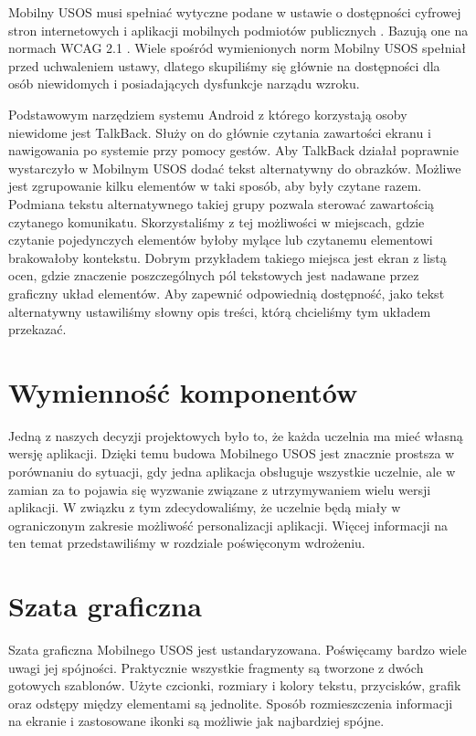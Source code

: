 \documentclass{pracamgr}
\begin{document}
Mobilny USOS musi spełniać wytyczne podane w ustawie o dostępności cyfrowej stron
internetowych i aplikacji mobilnych podmiotów publicznych \cite{uodc}. Bazują one
na normach WCAG 2.1 \cite{wcag21}. Wiele spośród wymienionych norm Mobilny USOS
spełniał przed uchwaleniem ustawy, dlatego skupiliśmy się głównie na dostępności
dla osób niewidomych i posiadających dysfunkcje narządu wzroku.

Podstawowym narzędziem systemu Android z którego korzystają osoby niewidome jest
TalkBack. Służy on do głównie czytania zawartości ekranu i nawigowania po systemie
przy pomocy gestów. Aby TalkBack działał poprawnie wystarczyło w Mobilnym USOS
dodać tekst alternatywny do obrazków. Możliwe jest zgrupowanie kilku elementów w
taki sposób, aby były czytane razem. Podmiana tekstu alternatywnego takiej grupy
pozwala sterować zawartością czytanego komunikatu. Skorzystaliśmy z tej możliwości
w miejscach, gdzie czytanie pojedynczych elementów byłoby mylące lub czytanemu
elementowi brakowałoby kontekstu. Dobrym przykładem takiego miejsca jest ekran z
listą ocen, gdzie znaczenie poszczególnych pól tekstowych jest nadawane przez
graficzny układ elementów. Aby zapewnić odpowiednią dostępność, jako tekst alternatywny
ustawiliśmy słowny opis treści, którą chcieliśmy tym układem przekazać.

\section{Wymienność komponentów}

Jedną z naszych decyzji projektowych było to, że każda uczelnia ma mieć własną
wersję aplikacji. Dzięki temu budowa Mobilnego USOS jest znacznie prostsza w porównaniu
do sytuacji, gdy jedna aplikacja obsługuje wszystkie uczelnie, ale w zamian za to
pojawia się wyzwanie związane z utrzymywaniem wielu wersji aplikacji. W związku z
tym zdecydowaliśmy, że uczelnie będą miały w ograniczonym zakresie możliwość
personalizacji aplikacji. Więcej informacji na ten temat przedstawiliśmy w rozdziale
poświęconym wdrożeniu.

\section{Szata graficzna}

Szata graficzna Mobilnego USOS jest ustandaryzowana. Poświęcamy bardzo wiele
uwagi jej spójności. Praktycznie wszystkie fragmenty są tworzone z dwóch gotowych
szablonów. Użyte czcionki, rozmiary i kolory tekstu, przycisków, grafik oraz odstępy
między elementami są jednolite. Sposób rozmieszczenia informacji na ekranie i
zastosowane ikonki są możliwie jak najbardziej spójne.
\end{document}
